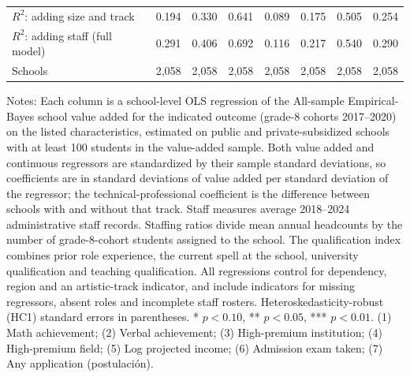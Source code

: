\begin{table}[!htbp]
{\begin{tabular}{lccccccc}
$R^2$: adding size and track & 0.194 & 0.330 & 0.641 & 0.089 & 0.175 & 0.505 & 0.254 \\
$R^2$: adding staff (full model) & 0.291 & 0.406 & 0.692 & 0.116 & 0.217 & 0.540 & 0.290 \\
Schools & 2,058 & 2,058 & 2,058 & 2,058 & 2,058 & 2,058 & 2,058 \\
\bottomrule
\end{tabular}}
\par\medskip
\footnotesize
\begin{minipage}{\textwidth}
Notes: Each column is a school-level OLS regression of the All-sample Empirical-Bayes school value added for the indicated outcome (grade-8 cohorts 2017--2020) on the listed characteristics, estimated on public and private-subsidized schools with at least 100 students in the value-added sample. Both value added and continuous regressors are standardized by their sample standard deviations, so coefficients are in standard deviations of value added per standard deviation of the regressor; the technical-professional coefficient is the difference between schools with and without that track. Staff measures average 2018--2024 administrative staff records. Staffing ratios divide mean annual headcounts by the number of grade-8-cohort students assigned to the school. The qualification index combines prior role experience, the current spell at the school, university qualification and teaching qualification. All regressions control for dependency, region and an artistic-track indicator, and include indicators for missing regressors, absent roles and incomplete staff rosters. Heteroskedasticity-robust (HC1) standard errors in parentheses. * $p<0.10$, ** $p<0.05$, *** $p<0.01$. (1) Math achievement; (2) Verbal achievement; (3) High-premium institution; (4) High-premium field; (5) Log projected income; (6) Admission exam taken; (7) Any application (postulaci\'on).
\end{minipage}
\end{table}
